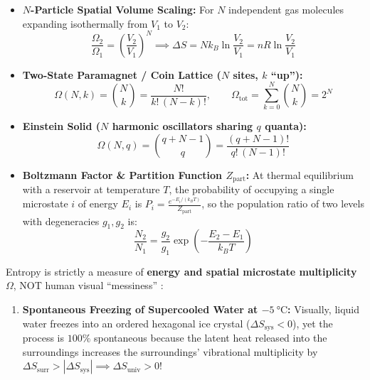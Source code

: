 \begin{twocol}[0.50]
\begin{formulacard}
\begin{itemize}
  \item \textbf{$N$-Particle Spatial Volume Scaling:} For $N$ independent gas molecules expanding isothermally from $V_1$ to $V_2$:
  \[
    \frac{\Omega_2}{\Omega_1} = \left(\frac{V_2}{V_1}\right)^N \implies \Delta S = N k_B\ln\frac{V_2}{V_1} = nR\ln\frac{V_2}{V_1}
  \]
  \item \textbf{Two-State Paramagnet / Coin Lattice ($N$ sites, $k$ ``up''):}
  \begin{equation}\label{eq:08:two-state-omega}
    \Omega(N, k) = \binom{N}{k} = \frac{N!}{k!\,(N - k)!}, \qquad \Omega_{\mathrm{tot}} = \sum_{k=0}^N \binom{N}{k} = 2^N
  \end{equation}
  \item \textbf{Einstein Solid ($N$ harmonic oscillators sharing $q$ quanta):}
  \begin{equation}\label{eq:08:einstein-solid}
    \Omega(N, q) = \binom{q + N - 1}{q} = \frac{(q + N - 1)!}{q!\,(N - 1)!}
  \end{equation}
  \item \textbf{Boltzmann Factor \& Partition Function $Z_{\mathrm{part}}$:} At thermal equilibrium with a reservoir at temperature $T$, the probability of occupying a single microstate $i$ of energy $E_i$ is $P_i = \frac{e^{-E_i/(k_BT)}}{Z_{\mathrm{part}}}$, so the population ratio of two levels with degeneracies $g_1, g_2$ is:
  \begin{equation}\label{eq:08:boltzmann-factor}
    \frac{N_2}{N_1} = \frac{g_2}{g_1}\exp\left(-\frac{E_2 - E_1}{k_B T}\right)
  \end{equation}
\end{itemize}
\end{formulacard}
\nextcol[0.48]
\begin{trapbox}[Why ``Entropy = Visual Disorder'' Fails on Exams!]
Entropy is strictly a measure of \textbf{energy and spatial microstate multiplicity $\Omega$}, NOT human visual ``messiness'' :
\begin{enumerate}
  \item \textbf{Spontaneous Freezing of Supercooled Water at $\SI{-5}{\celsius}$:} Visually, liquid water freezes into an ordered hexagonal ice crystal ($\Delta S_{\mathrm{sys}} < 0$), yet the process is $100\%$ spontaneous because the latent heat released into the surroundings increases the surroundings' vibrational multiplicity by $\Delta S_{\mathrm{surr}} > |\Delta S_{\mathrm{sys}}| \implies \Delta S_{\mathrm{univ}} > 0$!

\end{enumerate}
\end{trapbox}
\end{twocol}
